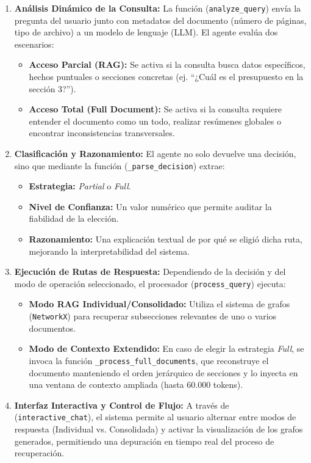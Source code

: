 \begin{enumerate}
    \item \textbf{Análisis Dinámico de la Consulta:}
    La función (\texttt{analyze\_query}) envía la pregunta del usuario junto con metadatos del documento (número de páginas, tipo de archivo) a un modelo de lenguaje (LLM). El agente evalúa dos escenarios:
    \begin{itemize}
        \item \textbf{Acceso Parcial (RAG):} Se activa si la consulta busca datos específicos, hechos puntuales o secciones concretas (ej. ``¿Cuál es el presupuesto en la sección 3?'').
        \item \textbf{Acceso Total (Full Document):} Se activa si la consulta requiere entender el documento como un todo, realizar resúmenes globales o encontrar inconsistencias transversales.
    \end{itemize}

    \item \textbf{Clasificación y Razonamiento:}
    El agente no solo devuelve una decisión, sino que mediante la función (\texttt{\_parse\_decision}) extrae:
    \begin{itemize}
        \item \textbf{Estrategia:} \textit{Partial} o \textit{Full}.
        \item \textbf{Nivel de Confianza:} Un valor numérico que permite auditar la fiabilidad de la elección.
        \item \textbf{Razonamiento:} Una explicación textual de por qué se eligió dicha ruta, mejorando la interpretabilidad del sistema.
    \end{itemize}

    \item \textbf{Ejecución de Rutas de Respuesta:}
    Dependiendo de la decisión y del modo de operación seleccionado, el procesador (\texttt{process\_query}) ejecuta:
    \begin{itemize}
        \item \textbf{Modo RAG Individual/Consolidado:} Utiliza el sistema de grafos (\texttt{NetworkX}) para recuperar subsecciones relevantes de uno o varios documentos.
        \item \textbf{Modo de Contexto Extendido:} En caso de elegir la estrategia \textit{Full}, se invoca la función \texttt{\_process\_full\_documents}, que reconstruye el documento manteniendo el orden jerárquico de secciones y lo inyecta en una ventana de contexto ampliada (hasta 60.000 tokens).
    \end{itemize}

    \item \textbf{Interfaz Interactiva y Control de Flujo:}
    A través de (\texttt{interactive\_chat}), el sistema permite al usuario alternar entre modos de respuesta (Individual vs. Consolidada) y activar la visualización de los grafos generados, permitiendo una depuración en tiempo real del proceso de recuperación.
\end{enumerate}

